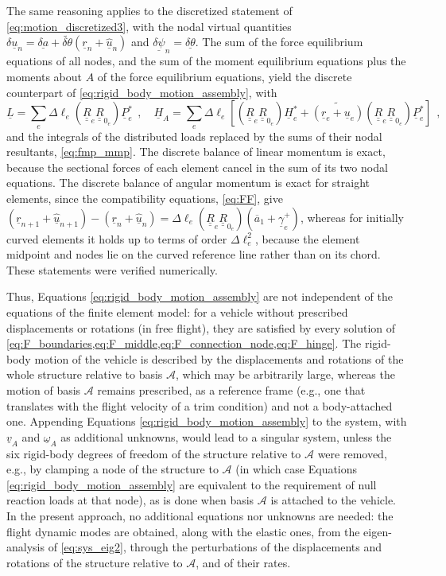 \documentclass[12pt,a4paper,oneside,english]{abntex2} %
\newcommand{\fix}[1]{{\color{red}#1}}
\newcommand{\vect}[1]{\underline{#1}}
\newcommand{\uvec}[1]{\overline{#1}}
\def\tens#1{\underline{\underline{#1}}}
\def\til#1{\widetilde{#1}}
\def\lb{\left[}
\def\rb{\right]}
\def\lp{\left(}
\def\rp{\right)}
\def\A{\mathcal{A}}
\def\aone{\uvec{a}_1}
\def\R{\tens{R}}
\def\r{\vect{r}}
\def\u{\vect{u}}
\def\uhat{\widehat{\u}}
\def\vA{\vect{v}_A}
\def\omA{\vect{\omega}_A}
\def\gam{\vect{\gamma}}
\def\gamp{\gam^{+}}
\def\P{\vect{P}}
\def\Ps{\P^*}
\def\Hv{\vect{H}}
\def\Hvs{\Hv^*}
\def\delpsi{\vect{\delta\psi}}
\def\Deltal{\Delta \ell_e}
\def\re{\r_e}
\def\ue{\u_e}
\def\gampe{\gamp_e}
\def\Pse{\Ps_e}
\def\Hse{\Hvs_e}
\def\Re{\R_{e}}
\def\Rze{\R_{0_e}}
\def\RRze{\lp\Re\Rze\rp}
\begin{document}
\fix{
The same reasoning applies to the discretized statement of \cref{eq:motion_discretized3}, with the nodal virtual quantities $\delta\u_n=\vect{\delta a}+\til{\delta\theta}\lp\r_n+\uhat_n\rp$ and $\delpsi_n=\vect{\delta\theta}$. The sum of the force equilibrium equations of all nodes, and the sum of the moment equilibrium equations plus the moments about $A$ of the force equilibrium equations, yield the discrete counterpart of \cref{eq:rigid_body_motion_assembly}, with
\begin{equation}
    \vect{L} = \sum_e \Deltal\RRze\Pse \ \ , \quad \Hv_A = \sum_e \Deltal\lb\RRze\Hse + \til{\lp\re+\ue\rp}\RRze\Pse\rb \ \ ,
\end{equation}
and the integrals of the distributed loads replaced by the sums of their nodal resultants, \cref{eq:fmp_mmp}. The discrete balance of linear momentum is exact, because the sectional forces of each element cancel in the sum of its two nodal equations. The discrete balance of angular momentum is exact for straight elements, since the compatibility equations, \cref{eq:FF}, give $\lp\r_{n+1}+\uhat_{n+1}\rp-\lp\r_n+\uhat_n\rp=\Deltal\RRze\lp\aone+\gampe\rp$, whereas for initially curved elements it holds up to terms of order $\Deltal^2$, because the element midpoint and nodes lie on the curved reference line rather than on its chord. These statements were verified numerically.
}

\fix{
Thus, Equations \ref{eq:rigid_body_motion_assembly} are not independent of the equations of the finite element model: for a vehicle without prescribed displacements or rotations (in free flight), they are satisfied by every solution of \cref{eq:F_boundaries,eq:F_middle,eq:F_connection_node,eq:F_hinge}. The rigid-body motion of the vehicle is described by the displacements and rotations of the whole structure relative to basis $\A$, which may be arbitrarily large, whereas the motion of basis $\A$ remains prescribed, as a reference frame (e.g., one that translates with the flight velocity of a trim condition) and not a body-attached one. Appending Equations \ref{eq:rigid_body_motion_assembly} to the system, with $\vA$ and $\omA$ as additional unknowns, would lead to a singular system, unless the six rigid-body degrees of freedom of the structure relative to $\A$ were removed, e.g., by clamping a node of the structure to $\A$ (in which case Equations \ref{eq:rigid_body_motion_assembly} are equivalent to the requirement of null reaction loads at that node), as is done when basis $\A$ is attached to the vehicle. In the present approach, no additional equations nor unknowns are needed: the flight dynamic modes are obtained, along with the elastic ones, from the eigen-analysis of \cref{eq:sys_eig2}, through the perturbations of the displacements and rotations of the structure relative to $\A$, and of their rates.
}
\end{document}
